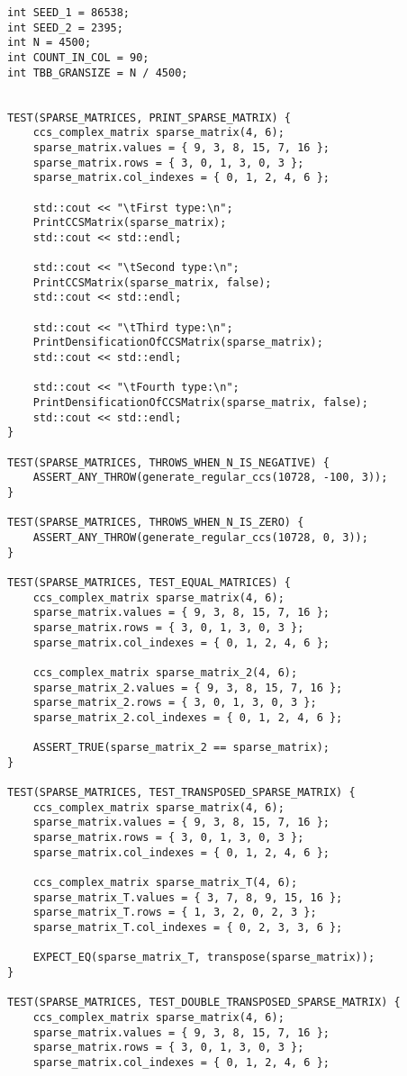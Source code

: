 \documentclass{report}
\begin{document}
\begin{itemize}
\begin{itemize}
\begin{lstlisting}
int SEED_1 = 86538;
int SEED_2 = 2395;
int N = 4500;
int COUNT_IN_COL = 90;
int TBB_GRANSIZE = N / 4500;


TEST(SPARSE_MATRICES, PRINT_SPARSE_MATRIX) {
    ccs_complex_matrix sparse_matrix(4, 6);
    sparse_matrix.values = { 9, 3, 8, 15, 7, 16 };
    sparse_matrix.rows = { 3, 0, 1, 3, 0, 3 };
    sparse_matrix.col_indexes = { 0, 1, 2, 4, 6 };

    std::cout << "\tFirst type:\n";
    PrintCCSMatrix(sparse_matrix);
    std::cout << std::endl;

    std::cout << "\tSecond type:\n";
    PrintCCSMatrix(sparse_matrix, false);
    std::cout << std::endl;

    std::cout << "\tThird type:\n";
    PrintDensificationOfCCSMatrix(sparse_matrix);
    std::cout << std::endl;

    std::cout << "\tFourth type:\n";
    PrintDensificationOfCCSMatrix(sparse_matrix, false);
    std::cout << std::endl;
}

TEST(SPARSE_MATRICES, THROWS_WHEN_N_IS_NEGATIVE) {
    ASSERT_ANY_THROW(generate_regular_ccs(10728, -100, 3));
}

TEST(SPARSE_MATRICES, THROWS_WHEN_N_IS_ZERO) {
    ASSERT_ANY_THROW(generate_regular_ccs(10728, 0, 3));
}

TEST(SPARSE_MATRICES, TEST_EQUAL_MATRICES) {
    ccs_complex_matrix sparse_matrix(4, 6);
    sparse_matrix.values = { 9, 3, 8, 15, 7, 16 };
    sparse_matrix.rows = { 3, 0, 1, 3, 0, 3 };
    sparse_matrix.col_indexes = { 0, 1, 2, 4, 6 };
    
    ccs_complex_matrix sparse_matrix_2(4, 6);
    sparse_matrix_2.values = { 9, 3, 8, 15, 7, 16 };
    sparse_matrix_2.rows = { 3, 0, 1, 3, 0, 3 };
    sparse_matrix_2.col_indexes = { 0, 1, 2, 4, 6 };
    
    ASSERT_TRUE(sparse_matrix_2 == sparse_matrix);
}

TEST(SPARSE_MATRICES, TEST_TRANSPOSED_SPARSE_MATRIX) {
    ccs_complex_matrix sparse_matrix(4, 6);
    sparse_matrix.values = { 9, 3, 8, 15, 7, 16 };
    sparse_matrix.rows = { 3, 0, 1, 3, 0, 3 };
    sparse_matrix.col_indexes = { 0, 1, 2, 4, 6 };
    
    ccs_complex_matrix sparse_matrix_T(4, 6);
    sparse_matrix_T.values = { 3, 7, 8, 9, 15, 16 };
    sparse_matrix_T.rows = { 1, 3, 2, 0, 2, 3 };
    sparse_matrix_T.col_indexes = { 0, 2, 3, 3, 6 };
    
    EXPECT_EQ(sparse_matrix_T, transpose(sparse_matrix));
}

TEST(SPARSE_MATRICES, TEST_DOUBLE_TRANSPOSED_SPARSE_MATRIX) {
    ccs_complex_matrix sparse_matrix(4, 6);
    sparse_matrix.values = { 9, 3, 8, 15, 7, 16 };
    sparse_matrix.rows = { 3, 0, 1, 3, 0, 3 };
    sparse_matrix.col_indexes = { 0, 1, 2, 4, 6 };


\end{lstlisting}
\end{itemize}
\end{itemize}
\end{document}
